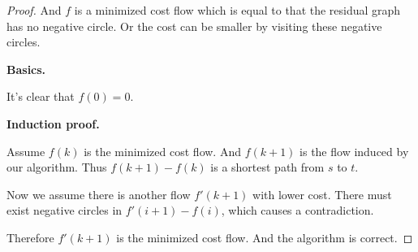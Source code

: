 \documentclass[12pt,a4paper]{article}
\theoremstyle{definition}
\begin{document}
\begin{enumerate}
\begin{proof}
        And $f$ is a minimized cost flow which is equal to that the residual graph has no negative circle.
        Or the cost can be smaller by visiting these negative circles.

        \textbf{Basics.}

        It's clear that $f(0)=0$.

        \textbf{Induction proof.}

        Assume $f(k)$ is the minimized cost flow. And $f(k+1)$ is the flow induced by our algorithm.
        Thus $f(k+1)-f(k)$ is a shortest path from $s$ to $t$.

        Now we assume there is another flow $f'(k+1)$ with lower cost. There must exist  negative circles in $f'(i+1)-f(i)$, which causes a contradiction.

        Therefore $f'(k+1)$ is the minimized cost flow. And the algorithm is correct.

    \end{proof}

\end{enumerate}






\end{document}

